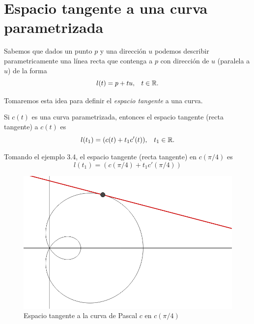 \section{Espacio tangente a una curva parametrizada}

Sabemos que dados un punto $p$ y una direcci\'on $u$ podemos describir parametricamente una
l\'inea recta que contenga a $p$ con direcci\'on de $u$ (paralela a $u$) de la forma
$$ l(t) = p + tu \text{,} \quad t \in \mathbb{R} \text{.}$$

Tomaremos esta idea para definir el \emph{espacio tangente} a una curva.

\begin{definition}
    Si $c(t)$ es una curva parametrizada, entonces el espacio tangente (recta tangente) a $c(t)$ es
    $$ l(t_{1}) = ( c(t) + t_{1}c'(t) ) \text{,} \quad t_{1} \in \mathbb{R} \text{.}$$
\end{definition}

\begin{myExample}
    Tomando el ejemplo 3.4, el espacio tangente (recta tangente) en $c(\pi/4)$ es
    $$ l(t_{1}) = (c(\pi/4) + t_{1}c'(\pi/4)) $$
\end{myExample}

\begin{figure}[!ht]
  \begin{center}
      \includegraphics[width=0.8\linewidth]{gfx/limacon}
      \caption{Espacio tangente a la curva de Pascal $c$ en $c(\pi/4)$}
      \label{fig:boat1}
  \end{center}
\end{figure}


